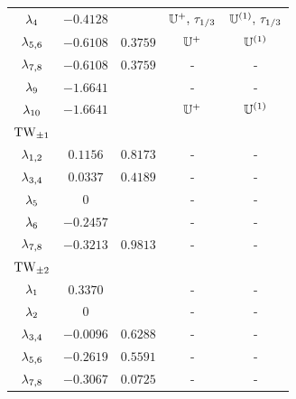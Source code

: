 \begin{table}[t]
\begin{center}
\begin{tabular}{ccccc}
  $\eigExp[4]$   &$-0.4128$ &          & $\bbU^+,\,\Shift_{1/3}$  & $\bbU^{(1)},\,\Shift_{1/3}$\\
  $\eigExp[5,6]$ &$-0.6108$ & $0.3759$ & $\bbU^+$     & $\bbU^{(1)}$\\
  $\eigExp[7,8]$ &$-0.6108$ & $0.3759$ & -         & -\\
  $\eigExp[9]$   &$-1.6641$ &          & -         & -\\
  $\eigExp[10]$  &$-1.6641$ &          & $\bbU^+$     & $\bbU^{(1)}$ \\\hline
$\REQV{\pm}{1}$&  &  & \\\hline
  $\eigExp[1,2]$ & $0.1156$ & $0.8173$ & -  & -\\
  $\eigExp[3,4]$ & $0.0337$ & $0.4189$ & -  & -\\
  $\eigExp[5]$   & $0$      &          & -  & -\\
  $\eigExp[6]$   &$-0.2457$ &          & -  & -\\
  $\eigExp[7,8]$ &$-0.3213$ & $0.9813$ & -  & -\\\hline
$\REQV{\pm}{2}$&  &  & \\\hline
  $\eigExp[1]  $ & $0.3370$ &          & -  & -\\
  $\eigExp[2]  $ & $0$      &          & -  & -\\
  $\eigExp[3,4]$ &$-0.0096$ & $0.6288$ & -  & -\\
  $\eigExp[5,6]$ &$-0.2619$ & $0.5591$ & -  & -\\
  $\eigExp[7,8]$ &$-0.3067$ & $0.0725$ & -  & -\\
\end{tabular}
\end{center}
\end{table}



